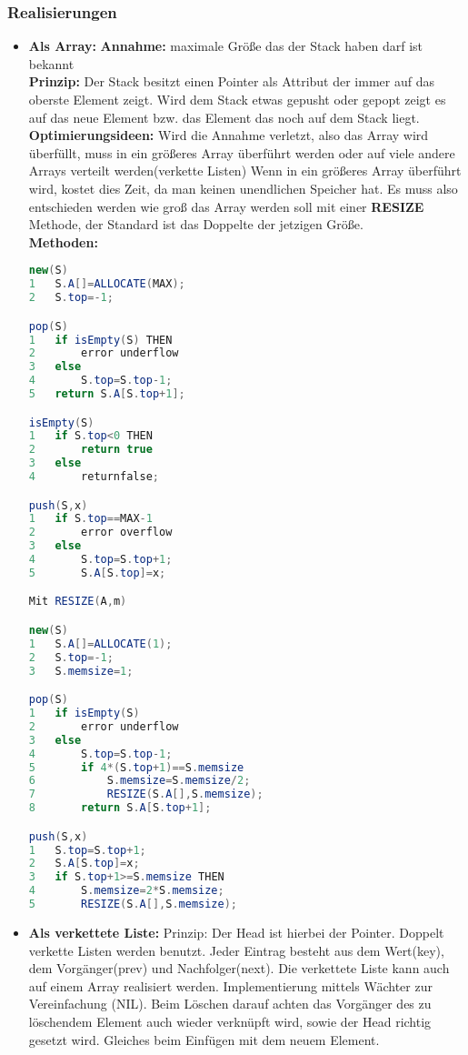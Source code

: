 \documentclass[jou,apacite]{apa6}
\begin{document}
\subsubsection{Realisierungen}
\begin{itemize}
\item {\bfseries Als Array:}
{\bfseries Annahme:} maximale Größe das der Stack haben darf ist bekannt
\\
{\bfseries Prinzip:} Der Stack besitzt einen Pointer als Attribut der immer auf das oberste Element zeigt. Wird dem Stack etwas gepusht oder gepopt zeigt es auf das neue Element bzw. das Element das noch auf dem Stack liegt. 
\\
{\bfseries Optimierungsideen:} Wird die Annahme verletzt, also das Array wird überfüllt, muss in ein größeres Array überführt werden oder auf viele andere Arrays verteilt werden(verkette Listen)
Wenn in ein größeres Array überführt wird, kostet dies Zeit, da man keinen unendlichen Speicher hat. Es muss also entschieden werden wie groß das Array werden soll mit einer {\bfseries RESIZE} Methode, der Standard ist das Doppelte der jetzigen Größe. \\
{\bfseries Methoden:} 
\begin{lstlisting}[language=java]
new(S)
1   S.A[]=ALLOCATE(MAX);
2   S.top=-1;

pop(S)
1   if isEmpty(S) THEN
2       error underflow
3   else 
4       S.top=S.top-1;
5   return S.A[S.top+1];

isEmpty(S)
1   if S.top<0 THEN
2       return true
3   else 
4       returnfalse;

push(S,x)
1   if S.top==MAX-1  
2       error overflow
3   else 
4       S.top=S.top+1;
5       S.A[S.top]=x;

Mit RESIZE(A,m)

new(S)
1   S.A[]=ALLOCATE(1);
2   S.top=-1;
3   S.memsize=1;

pop(S)
1   if isEmpty(S) 
2       error underflow
3   else
4       S.top=S.top-1;
5       if 4*(S.top+1)==S.memsize 
6           S.memsize=S.memsize/2;
7           RESIZE(S.A[],S.memsize);
8       return S.A[S.top+1];

push(S,x)
1   S.top=S.top+1;
2   S.A[S.top]=x;
3   if S.top+1>=S.memsize THEN
4       S.memsize=2*S.memsize;
5       RESIZE(S.A[],S.memsize);
\end{lstlisting}
\item {\bfseries Als verkettete Liste:}
Prinzip: Der Head ist hierbei der Pointer. Doppelt verkette Listen werden benutzt. Jeder Eintrag besteht aus dem Wert(key), dem Vorgänger(prev) und Nachfolger(next). Die verkettete Liste kann auch auf einem Array realisiert werden. Implementierung mittels Wächter zur Vereinfachung (NIL). Beim Löschen darauf achten das Vorgänger des zu löschendem Element auch wieder verknüpft wird, sowie der Head richtig gesetzt wird. Gleiches beim Einfügen mit dem neuem Element.

\end{itemize}
\end{document}

